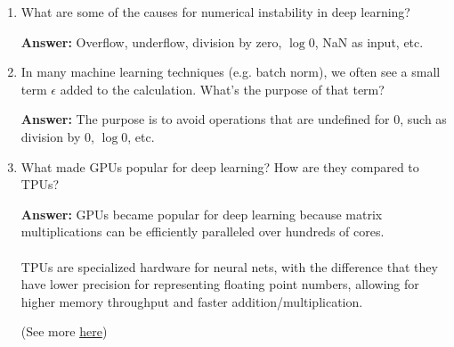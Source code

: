 \documentclass{article}
\newenvironment{QandA}{\begin{enumerate}[label=\arabic*.]}{\end{enumerate}}
\newenvironment{InnerQandA}{\begin{enumerate}[label=\roman*.]}{\end{enumerate}}
\newenvironment{answer}{\par\normalfont \textbf{Answer:}}{}
\begin{document}
\begin{QandA}
\begin{InnerQandA}
\begin{answer}
            However, this algorithm has exponential runtime complexity making it as inefficient as the naive approach of trying all permutations. The reason is that the algorithm does a lot of redundant work. For example, above we made a recursive call to find the best cost for computing both ABC and AB. But finding the best cost for computing ABC also requires finding the best cost for AB. As the recursion grows deeper, more and more of this type of unnecessary repetition occurs.
            
            One simple solution is called memoization: each time we compute the minimum cost needed to multiply out a specific subsequence, we save it. 
            
            (Source: \href{https://en.wikipedia.org/wiki/Matrix\_chain\_multiplication}{Wikipedia})
        \end{answer}
    \end{InnerQandA}
    
    \item What are some of the causes for numerical instability in deep learning?
    \begin{answer}
        Overflow, underflow, division by zero, $\log 0$, NaN as input, etc.
    \end{answer}

    \item In many machine learning techniques (e.g. batch norm), we often see a small term $\epsilon$ added to the calculation. What’s the purpose of that term?
    \begin{answer}
        The purpose is to avoid operations that are undefined for 0, such as division by 0, $\log 0$, etc.
    \end{answer}

    \item What made GPUs popular for deep learning? How are they compared to TPUs?
    \begin{answer}
        GPUs became popular for deep learning because matrix multiplications can be efficiently paralleled over hundreds of cores. \\\\
        TPUs are specialized hardware for neural nets, with the difference that they have lower precision for representing floating point numbers, allowing for higher memory throughput and faster addition/multiplication.

        (See more \href{https://www.quora.com/Why-do-Googles-tensor-processing-units-TPUs-use-less-precision-than-a-standard-GPU}{here})
    \end{answer}


\end{QandA}
\end{document}
